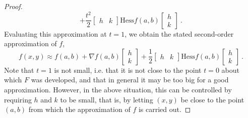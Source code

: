 \begin{proof}
\[+ \frac{t^2}{2} \begin{bmatrix} h & k \end{bmatrix}
\mathrm{Hess} f (a,b) \begin{bmatrix} h \\ k \end{bmatrix} \:.
\]
Evaluating this approximation at $t=1$, we obtain the stated second-order approximation of $f$,
\[
f(x,y) \approx f(a,b) + \nabla f (a,b) \begin{bmatrix} h \\ k \end{bmatrix} 
+ \frac{1}{2} \begin{bmatrix} h & k \end{bmatrix}
\mathrm{Hess} f (a,b) \begin{bmatrix} h \\ k \end{bmatrix} \:.
\]
Note that $t=1$ is not small, i.e. that it is not close to the point $t=0$ about which $F$ was developed, and that in general it may be too big for a good approximation. However, in the above situation, this can be controlled by requiring $h$ and $k$ to be small, that is, by letting $(x,y)$ be close to the point $(a,b)$ from which the approximation of $f$ is carried out.
\end{proof}

